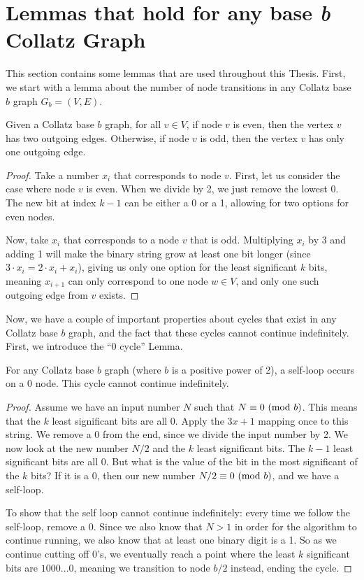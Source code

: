 \section{Lemmas that hold for any base \textit{b} Collatz Graph}
This section contains some lemmas that are used throughout this Thesis. First, we start with a lemma about the number of node transitions in any Collatz base $b$ graph $G_b= (V,E)$.
\begin{lemma}
\label{lem:numOutEdges}
Given a Collatz base $b$ graph, for all $v \in V$, if node $v$ is even, then the vertex $v$ has two outgoing edges. Otherwise, if node $v$ is odd, then the vertex $v$ has only one outgoing edge.
\end{lemma}
\begin{proof}
Take a number $x_i$ that corresponds to node $v$. First, let us consider the case where node $v$ is even. When we divide by 2, we just remove the lowest 0. The new bit at index $k-1$ can be either a 0 or a 1, allowing for two options for even nodes. \par
Now, take $x_i$ that corresponds to a node $v$ that is odd. Multiplying $x_i$ by 3 and adding 1 will make the binary string grow at least one bit longer (since $3\cdot x_i = 2 \cdot x_i + x_i$), giving us only one option for the least significant $k$ bits, meaning $x_{i+1}$ can only correspond to one node $w \in V$, and only one such outgoing edge from $v$ exists.
\end{proof}
Now, we have a couple of important properties about cycles that exist in any Collatz base $b$ graph, and the fact that these cycles cannot continue indefinitely. First, we introduce the ``0 cycle'' Lemma.
\begin{lemma}
\label{lem:zeroCycle}
For any Collatz base $b$ graph (where $b$ is a positive power of 2), a self-loop occurs on a 0 node. This cycle cannot continue indefinitely.
\end{lemma}
\begin{proof}
Assume we have an input number $N$ such that $N \equiv 0 \ (\mathrm{mod}\ b)$. This means that the $k$ least significant bits are all 0. Apply the $3x+1$ mapping once to this string. We remove a 0 from the end, since we divide the input number by 2. We now look at the new number $N/2$ and the $k$ least significant bits. The $k-1$ least significant bits are all 0. But what is the value of the bit in the most significant of the $k$ bits? If it is a 0, then our new number $N/2 \equiv 0 \ (\mathrm{mod}\ b)$, and we have a self-loop. \par
To show that the self loop cannot continue indefinitely: every time we follow the self-loop, remove a 0. Since we also know that $N > 1$ in order for the algorithm to continue running, we also know that at least one binary digit is a 1. So as we continue cutting off 0's, we eventually reach a point where the least $k$ significant bits are $1000\ldots 0$, meaning we transition to node $b/2$ instead, ending the cycle.
\end{proof}
